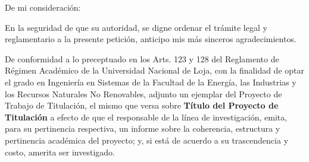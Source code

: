 \documentclass[12pt,a4paper,sans]{moderncv}
\newcommand{\titulo}{Título del Proyecto de Titulación}
\begin{document}
\date{Loja, 24 de agosto del 2020}
\opening{De mi consideración:}
\closing{En la seguridad de que su autoridad, se digne ordenar el trámite legal y reglamentario a la presente petición, anticipo mis más sinceros agradecimientos.}
\makelettertitle

De conformidad a lo preceptuado en los Arts. 123 y 128 del Reglamento de Régimen Académico de la Universidad Nacional de Loja, con la finalidad de optar el grado en Ingeniería en Sistemas de la Facultad de la Energía, las Industrias y los Recursos Naturales No Renovables, adjunto un ejemplar del Proyecto de Trabajo de Titulación, el mismo que versa sobre \textbf{\titulo } a efecto de que el responsable de la línea de investigación, emita, para su pertinencia respectiva, un informe sobre la coherencia, estructura y pertinencia académica del proyecto; y, si está de acuerdo a su trascendencia y costo, amerita ser investigado.

\makeletterclosing
\end{document}
